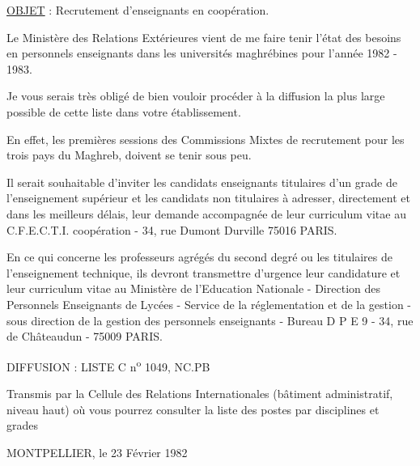 
\uline{OBJET} : Recrutement d'enseignants en coopération.

Le Ministère des Relations Extérieures vient de me faire tenir l'état des besoins en personnels enseignants dans les universités maghrébines pour l'année 1982 - 1983.

Je vous serais très obligé de bien vouloir procéder à la diffusion la plus large possible de cette liste dans votre établissement.

En effet, les premières sessions des Commissions Mixtes de recrutement pour les trois pays du Maghreb, doivent se tenir sous peu.

Il serait souhaitable d'inviter les candidats enseignants titulaires d'un grade de l'enseignement supérieur et les candidats non titulaires à adresser, directement et dans les meilleurs délais, leur demande accompagnée de leur curriculum vitae au C.F.E.C.T.I.  coopération - 34, rue Dumont Durville 75016 PARIS.

En ce qui concerne les professeurs agrégés du second degré ou les titulaires de l'enseignement technique, ils devront transmettre d'urgence leur candidature et leur curriculum vitae au Ministère de l'Education Nationale - Direction des Personnels Enseignants de Lycées - Service de la réglementation et de la gestion - sous direction de la gestion des personnels enseignants - Bureau D P E 9 - 34, rue de Châteaudun - 75009 PARIS.

DIFFUSION : LISTE C n\textsuperscript{o} 1049, NC.PB

Transmis par la Cellule des Relations Internationales (bâtiment administratif, niveau haut) où vous pourrez consulter la liste des postes par disciplines et grades

MONTPELLIER, le 23 Février 1982

